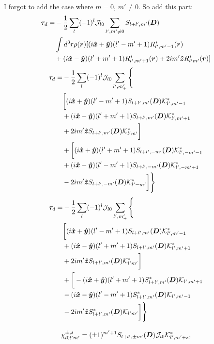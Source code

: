 \documentclass[aps,twocolumn,secnumarabic,balancelastpage,amsmath,amssymb,nofootinbib,floatfix]{revtex4-1}
\begin{document}
I forgot to add the case where $m=0$, $m'\neq 0$. So add this part:
\begin{equation*}
\begin{aligned}
\bm \tau_d = &-\frac{1}{2}\sum_{l}(-1)^l\mathcal{J}_{l0}\sum_{l',m'\neq 0}S_{l+l',m'}(\bm D) \\
&\int d^3 r \rho(\bm r) [(i\bm{\hat x} + \bm{\hat y})(l'-m'+1)R^*_{l',m'-1}(\bm r)\\
&+(i\bm{\hat x}-\bm{\hat y})(l'+m'+1)R^*_{l',m'+1}(\bm r)+2im'\bm{\hat z} R^*_{l'm'}(\bm r)]
\end{aligned}
\end{equation*}
\begin{equation*}
\begin{aligned}
\bm \tau_d = &-\frac{1}{2}\sum_{l}(-1)^l\mathcal{J}_{l0}\sum_{l',m'_+}\Bigg\{ \\
&\bigg[(i\bm{\hat x} + \bm{\hat y})(l'-m'+1)S_{l+l',m'}(\bm D)\mathcal{K}^*_{l',m'-1}\\
&+(i\bm{\hat x}-\bm{\hat y})(l'+m'+1)S_{l+l',m'}(\bm D)\mathcal{K}^*_{l',m'+1}\\
&+2im'\bm{\hat z} S_{l+l',m'}(\bm D)\mathcal{K}^*_{l'm'}\bigg]\\
&+\bigg[(i\bm{\hat x} + \bm{\hat y})(l'+m'+1)S_{l+l',-m'}(\bm D)\mathcal{K}^*_{l',-m'-1}\\
&+(i\bm{\hat x}-\bm{\hat y})(l'-m'+1)S_{l+l',-m'}(\bm D)\mathcal{K}^*_{l',-m'+1}\\
&-2im'\bm{\hat z} S_{l+l',-m'}(\bm D)\mathcal{K}^*_{l'-m'}\bigg]\Bigg\}
\end{aligned}
\end{equation*}
\begin{equation*}
\begin{aligned}
\bm \tau_d = &-\frac{1}{2}\sum_{l}(-1)^l\mathcal{J}_{l0}\sum_{l',m'_+}\Bigg\{ \\
&\bigg[(i\bm{\hat x} + \bm{\hat y})(l'-m'+1)S_{l+l',m'}(\bm D)\mathcal{K}^*_{l',m'-1}\\
&+(i\bm{\hat x}-\bm{\hat y})(l'+m'+1)S_{l+l',m'}(\bm D)\mathcal{K}^*_{l',m'+1}\\
&+2im'\bm{\hat z} S_{l+l',m'}(\bm D)\mathcal{K}^*_{l'm'}\bigg]\\
&+\bigg[-(i\bm{\hat x} + \bm{\hat y})(l'+m'+1)S^*_{l+l',m'}(\bm D)\mathcal{K}_{l',m'+1}\\
&-(i\bm{\hat x}-\bm{\hat y})(l'-m'+1)S^*_{l+l',m'}(\bm D)\mathcal{K}_{l',m'-1}\\
&-2im'\bm{\hat z} S^*_{l+l',m'}(\bm D)\mathcal{K}_{l'm'}\bigg]\Bigg\}
\end{aligned}
\end{equation*}


\begin{equation}
\begin{aligned}
\chi_{l0l'm'}^{\pm,s}&= (\pm 1)^{m'+1}S_{l+l',\pm m'}(\bm D)\mathcal{J}_{l0} \mathcal{K}^*_{l',m'+s},\\
\end{aligned}
\label{eqn:chi}
\end{equation}
\end{document}
